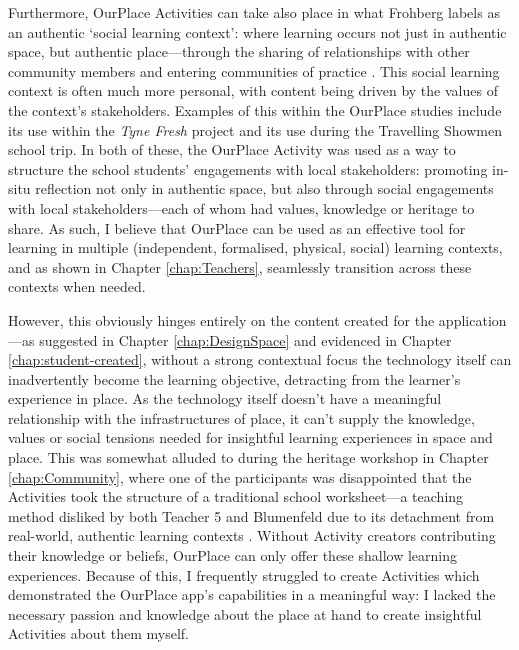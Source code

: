 Furthermore, OurPlace Activities can take also place in what Frohberg labels as an authentic `social learning context': where learning occurs not just in authentic space, but authentic place---through the sharing of relationships with other community members and entering communities of practice \citep{lave1991situated}. This social learning context is often much more personal, with content being driven by the values of the context's stakeholders. Examples of this within the OurPlace studies include its use within the \textit{Tyne Fresh} project and its use during the Travelling Showmen school trip. In both of these, the OurPlace Activity was used as a way to structure the school students' engagements with local stakeholders: promoting in-situ reflection not only in authentic space, but also through social engagements with local stakeholders---each of whom had values, knowledge or heritage to share. As such, I believe that OurPlace can be used as an effective tool for learning in multiple (independent, formalised, physical, social) learning contexts, and as shown in Chapter \ref{chap:Teachers}, seamlessly transition across these contexts when needed.

However, this obviously hinges entirely on the content created for the application---as suggested in Chapter \ref{chap:DesignSpace} and evidenced in Chapter \ref{chap:student-created}, without a strong contextual focus the technology itself can inadvertently become the learning objective, detracting from the learner's experience in place. As the technology itself doesn't have a meaningful relationship with the infrastructures of place, it can't supply the knowledge, values or social tensions needed for insightful learning experiences in space and place. This was somewhat alluded to during the heritage workshop in Chapter \ref{chap:Community}, where one of the participants was disappointed that the Activities took the structure of a traditional school worksheet---a teaching method disliked by both Teacher 5 and Blumenfeld due to its detachment from real-world, authentic learning contexts \citep{Blumenfeld1991}. Without Activity creators contributing their knowledge or beliefs, OurPlace can only offer these shallow learning experiences. Because of this, I frequently struggled to create Activities which demonstrated the OurPlace app's capabilities in a meaningful way: I lacked the necessary passion and knowledge about the place at hand to create insightful Activities about them myself.

